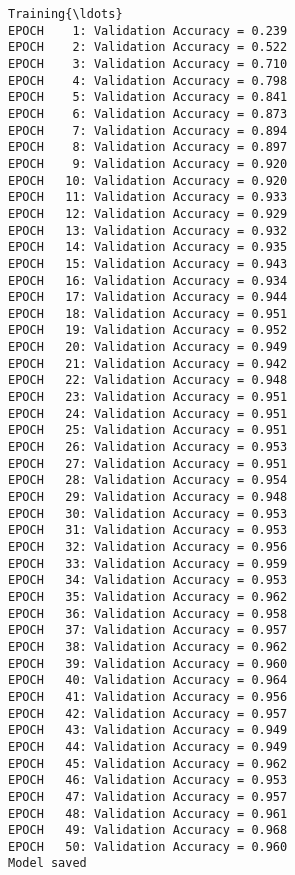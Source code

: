 \documentclass[11pt]{article}
\begin{document}
    \begin{Verbatim}[commandchars=\\\{\}]
Training{\ldots}
EPOCH    1: Validation Accuracy = 0.239
EPOCH    2: Validation Accuracy = 0.522
EPOCH    3: Validation Accuracy = 0.710
EPOCH    4: Validation Accuracy = 0.798
EPOCH    5: Validation Accuracy = 0.841
EPOCH    6: Validation Accuracy = 0.873
EPOCH    7: Validation Accuracy = 0.894
EPOCH    8: Validation Accuracy = 0.897
EPOCH    9: Validation Accuracy = 0.920
EPOCH   10: Validation Accuracy = 0.920
EPOCH   11: Validation Accuracy = 0.933
EPOCH   12: Validation Accuracy = 0.929
EPOCH   13: Validation Accuracy = 0.932
EPOCH   14: Validation Accuracy = 0.935
EPOCH   15: Validation Accuracy = 0.943
EPOCH   16: Validation Accuracy = 0.934
EPOCH   17: Validation Accuracy = 0.944
EPOCH   18: Validation Accuracy = 0.951
EPOCH   19: Validation Accuracy = 0.952
EPOCH   20: Validation Accuracy = 0.949
EPOCH   21: Validation Accuracy = 0.942
EPOCH   22: Validation Accuracy = 0.948
EPOCH   23: Validation Accuracy = 0.951
EPOCH   24: Validation Accuracy = 0.951
EPOCH   25: Validation Accuracy = 0.951
EPOCH   26: Validation Accuracy = 0.953
EPOCH   27: Validation Accuracy = 0.951
EPOCH   28: Validation Accuracy = 0.954
EPOCH   29: Validation Accuracy = 0.948
EPOCH   30: Validation Accuracy = 0.953
EPOCH   31: Validation Accuracy = 0.953
EPOCH   32: Validation Accuracy = 0.956
EPOCH   33: Validation Accuracy = 0.959
EPOCH   34: Validation Accuracy = 0.953
EPOCH   35: Validation Accuracy = 0.962
EPOCH   36: Validation Accuracy = 0.958
EPOCH   37: Validation Accuracy = 0.957
EPOCH   38: Validation Accuracy = 0.962
EPOCH   39: Validation Accuracy = 0.960
EPOCH   40: Validation Accuracy = 0.964
EPOCH   41: Validation Accuracy = 0.956
EPOCH   42: Validation Accuracy = 0.957
EPOCH   43: Validation Accuracy = 0.949
EPOCH   44: Validation Accuracy = 0.949
EPOCH   45: Validation Accuracy = 0.962
EPOCH   46: Validation Accuracy = 0.953
EPOCH   47: Validation Accuracy = 0.957
EPOCH   48: Validation Accuracy = 0.961
EPOCH   49: Validation Accuracy = 0.968
EPOCH   50: Validation Accuracy = 0.960
Model saved

    \end{Verbatim}

    \begin{center}
    \end{center}
    { \hspace*{\fill} \\}
    
\end{document}

